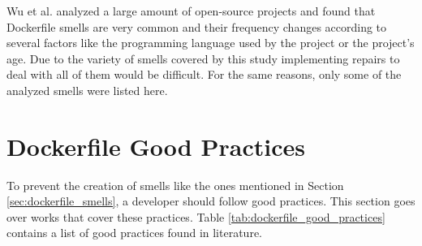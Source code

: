 Wu et al. \cite{wuCharacterizingOccurrenceDockerfile2020} analyzed a large amount of open-source projects and found that Dockerfile smells are very common and their frequency changes according to several factors like the programming language used by the project or the project's age. Due to the variety of smells covered by this study implementing repairs to deal with all of them would be difficult. For the same reasons, only some of the analyzed smells were listed here.

\section{Dockerfile Good Practices} \label{sec:dockerfile_good_practices}

To prevent the creation of smells like the ones mentioned in Section \ref{sec:dockerfile_smells}, a developer should follow good practices. This section goes over works that cover these practices. Table \ref{tab:dockerfile_good_practices} contains a list of good practices found in literature.

